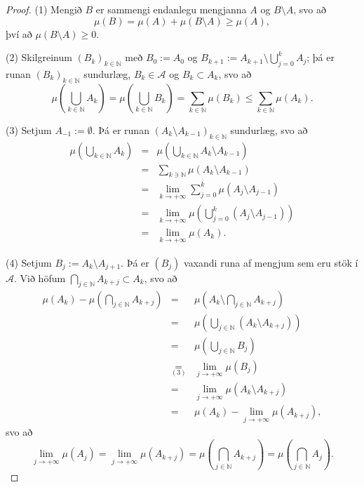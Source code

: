 \documentclass[a4paper,icelandic,11pt]{book}
\theoremstyle{plain}      \newtheorem{setn}{Setning}[chapter]
\theoremstyle{definition} \newtheorem{skilgr}[setn]{Skilgreining}
\theoremstyle{remark}     \newtheorem*{ath}{Athugasemd}
\newcommand{\N}{\mathbb N}
\begin{document}
\begin{proof}
  (1) Mengið $B$ er sammengi endanlegu mengjanna $A$ og
  $B\setminus{A}$, svo að
  \[
  \mu(B) = \mu(A)+\mu(B\setminus A)\ge \mu(A),
  \]
  því að $\mu(B\setminus A)\ge 0$.

  (2) Skilgreinum $(B_{k})_{k\in\N}$ með $B_{0}:=A_{0}$ og
  $B_{k+1}:=A_{k+1}\setminus\bigcup_{j=0}^{k}A_{j}$; þá er runan
  $(B_{k})_{k\in\N}$ sundurlæg, $B_{k}\in \mathcal A$ og
  $B_{k}\subset{A_{k}}$, svo að
  \[
  \mu
  \left(
    \bigcup_{k\in\N}A_{k}
  \right)
  = \mu
  \left(
    \bigcup_{k\in\N}B_{k}
  \right)
  = \sum_{k\in\N}\mu(B_{k})
  \le \sum_{k\in\N}\mu(A_{k})
  .
  \]
  
  (3) Setjum $A_{-1}:=\emptyset$. Þá er runan
  $(A_{k}\setminus{A_{k-1}})_{k\in\N}$ sundurlæg, svo að
  \begin{eqnarray*}
    \mu \left( \bigcup_{k\in\N}A_{k} \right)
    &=& \mu \left( \bigcup_{k\in\N}A_{k}\setminus A_{k-1} \right) \\
    &=& \sum_{k\ni\N}\mu(A_{k}\setminus A_{k-1}) \\
    &=& \lim_{k\to+\infty}\sum_{j=0}^{k}\mu(A_{j}\setminus A_{j-1}) \\
    &=& \lim_{k\to+\infty}\mu \left(
      \bigcup_{j=0}^{k}(A_{j}\setminus A_{j-1})
    \right) \\
    &=& \lim_{k\to+\infty}\mu(A_{k}).
  \end{eqnarray*}

  (4) Setjum $B_{j}:=A_{k}\setminus A_{j+1}$. Þá er $(B_{j})$ vaxandi
  runa af mengjum sem eru stök í $\mathcal A$. Við höfum
  $\bigcap_{j\in\N}A_{k+j}\subset{A_{k}}$, svo að 
  \begin{eqnarray*}
    \mu(A_{k})-\mu\left(\bigcap_{j\in\N}A_{k+j}\right)
    &=& \mu\left(A_{k}\setminus\bigcap_{j\in\N}A_{k+j}\right) \\
    &=& \mu\left(\bigcup_{j\in\N}(A_{k}\setminus A_{k+j})\right) \\
    &=& \mu\left(\bigcup_{j\in\N}B_{j}\right) \\
    &{\underset{(3)}{=}}& \lim_{j\to+\infty}\mu(B_{j}) \\
    &=& \lim_{j\to+\infty}\mu(A_{k}\setminus A_{k+j}) \\
    &=& \mu(A_{k})-\lim_{j\to+\infty}\mu(A_{k+j}),
  \end{eqnarray*}
  svo að
  \[
  \lim_{j\to+\infty}\mu(A_{j})
  = \lim_{j\to+\infty}\mu(A_{k+j})
  = \mu\left(\bigcap_{j\in\N}A_{k+j}\right)
  = \mu\left(\bigcap_{j\in\N}A_{j}\right).
  \]
\end{proof}
\end{document}
